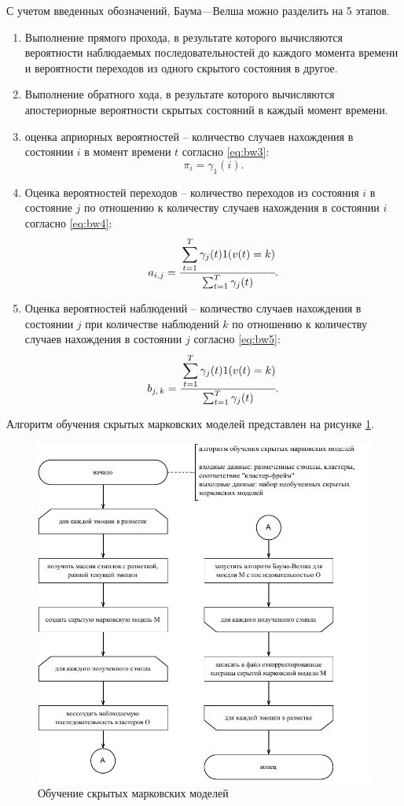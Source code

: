 С учетом введенных обозначений, Баума---Велша можно разделить на 5 этапов.
\begin{enumerate}
	\item Выполнение прямого прохода, в результате которого вычисляются вероятности наблюдаемых последовательностей до каждого момента времени и вероятности переходов из одного скрытого состояния в другое.
	\item Выполнение обратного хода, в результате которого вычисляются апостериорные вероятности скрытых состояний в каждый момент времени.
	\item оценка априорных вероятностей -- количество случаев нахождения в состоянии $i$ в момент времени $t$ согласно \ref{eq:bw3}:
	\begin{equation}\label{eq:bw3}
		\pi_i = \gamma_1(i).
	\end{equation}
	\item  Оценка вероятностей переходов -- количество переходов из состояния  $i$ в состояние $j$ по отношению к количеству случаев нахождения в состоянии $i$ согласно \ref{eq:bw4}:
	\begin{equation}\label{eq:bw4}
		a_{i, j} = \cfrac{\displaystyle\sum_{t=1}^T \gamma_j(t) 1(v(t)=k)}{\sum_{t=1}^T \gamma_j(t)}.
	\end{equation}
	\item Оценка вероятностей наблюдений -- количество случаев нахождения в состоянии $j$ при количестве наблюдений $k$ по отношению к количеству случаев нахождения в состоянии $j$ согласно \ref{eq:bw5}:
	\begin{equation}\label{eq:bw5}
		b_{j,\,k} = \cfrac{\displaystyle\sum_{t=1}^T \gamma_j(t) 1(v(t)=k)}{\sum_{t=1}^T \gamma_j(t)}. 
	\end{equation}
\end{enumerate}
Алгоритм обучения скрытых марковских моделей представлен на рисунке \ref{fig:hmm-train}.
\begin{figure}[H]
	\centering
	\includegraphics[width=0.8\linewidth]{assets/hmm-train}
	\caption{Обучение скрытых марковских моделей}
	\label{fig:hmm-train}
\end{figure}

